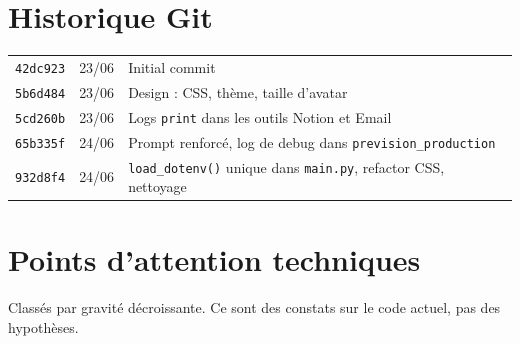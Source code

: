 \documentclass[10.5pt,a4paper]{article}
\newcommand{\code}[1]{\texttt{#1}}
\begin{document}
\section{Historique Git}
\begin{center}\small
\begin{tabular}{@{}l l L{12cm}@{}}
\toprule
\code{42dc923} & 23/06 & Initial commit \\
\code{5b6d484} & 23/06 & Design : CSS, thème, taille d'avatar \\
\code{5cd260b} & 23/06 & Logs \code{print} dans les outils Notion et Email \\
\code{65b335f} & 24/06 & Prompt renforcé, log de debug dans \code{prevision\_production} \\
\code{932d8f4} & 24/06 & \code{load\_dotenv()} unique dans \code{main.py}, refactor CSS, nettoyage \\
\bottomrule
\end{tabular}
\end{center}

\section{Points d'attention techniques}
Classés par gravité décroissante. Ce sont des constats sur le code actuel, pas des hypothèses.
\end{document}
